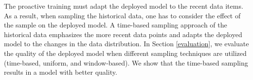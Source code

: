 The proactive training must adapt the deployed model to the recent data items.
As a result, when sampling the historical data, one has to consider the effect of the sample on the deployed model.
A time-based sampling approach of the historical data emphasizes the more recent data points and adapts the deployed model to the changes in the data distribution.
In Section \ref{evaluation}, we evaluate the quality of the deployed model when different sampling techniques are utilized (time-based, uniform, and window-based).
We show that the time-based sampling results in a model with better quality.



